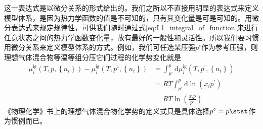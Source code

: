 \documentclass[main.tex]{subfiles}
\begin{document}
这一表达式是以微分关系的形式给出的。我们之所以不直接用明显的表达式来定义模型体系，是因为热力学函数的值是不可知的，只有其变化量是可是可知的。用微分表达式来规定规律性，可供我们随时通过式\eqref{eq:I.1_integral_of_function}来进行任意状态之间的热力学函数变化量，故有最好的一般性和灵活性。所以我们要习惯用微分关系来定义模型体系的方式。例如，我们可任选某压强$p^\circ$作为参考压强，则理想气体混合物等温等组分压它们过程的化学势变化就是
\begin{equation}\label{eq:II.3_ideal_gas_mixture_mu_p0}
    \begin{aligned}
        \mu_i^\text{ig}\left(T,p,\left\{n_i\right\}\right)-\mu_i^\text{ig}\left(T,p^\circ,\left\{n_i\right\}\right) & =\int_{p^\circ}^p\mathrm{d}\mu_i^\text{ig}\left(T,p^\prime,\left\{n_i\right\}\right) \\
                                                                                                                    & =RT\int_{p^\circ}^p\mathrm{d}\ln\left(x_ip^\prime\right)                             \\
                                                                                                                    & =RT\ln\left(\frac{x_ip}{p^\circ}\right)
    \end{aligned}
\end{equation}
《物理化学》书上的理想气体混合物化学势的定义式只是具体选择$p^\circ=p\stst$作为惯例而已。
\end{document}
